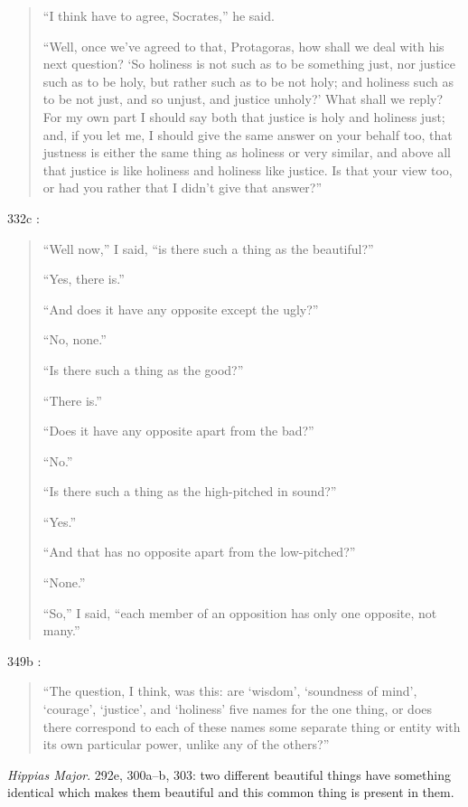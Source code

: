 \documentclass{article}
\theoremstyle{definition}
\begin{document}
\begin{quote}
``I think have to agree, Socrates,'' he said.

``Well, once we've agreed to that, Protagoras, how shall we deal with his next question? `So holiness is not such as to be something just, nor justice such as to be holy,
but rather such as to be not holy; and holiness such as to be not just, and so unjust, and justice unholy?' What shall we reply? For my own part I should say both that
justice is holy and holiness just; and, if you let me, I should give the same answer on your behalf too, that justness is either the same thing as holiness or very similar,
and above all that justice is like holiness and holiness like justice. Is that your view too, or had you rather that I didn't give that answer?''
\end{quote}

332c \cite[p.~30]{taylorprotagoras}:
\begin{quote}
``Well now,'' I said, ``is there such a thing as the beautiful?''

``Yes, there is.''

``And does it have any opposite except the ugly?''

``No, none.''

``Is there such a thing as the good?''

``There is.''

``Does it have any opposite apart from the bad?''

``No.''

``Is there such a thing as the high-pitched in sound?''

``Yes.''

``And that has no opposite apart from the low-pitched?''

``None.''

``So,'' I said, ``each member of an opposition has only one opposite, not many.''
\end{quote}

349b \cite[p.~50]{taylorprotagoras}:
\begin{quote}
``The question, I think, was this: are `wisdom', `soundness of mind', `courage', `justice', and `holiness' five names for the one thing, or does there correspond to
each of these names some separate thing or entity with its own particular power, unlike any of the others?''
\end{quote}


{\em Hippias Major}.  292e, 300a--b, 303: two different beautiful things have something identical which makes them beautiful and this
common thing is present in them.
\end{document}
